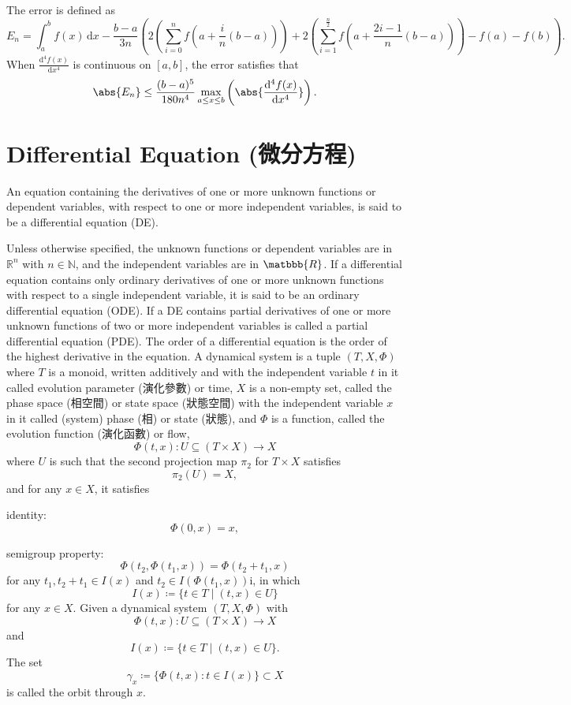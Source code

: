 \documentclass[a4paper,12pt]{report}
\begin{document}
{{{{{{{{{{{{{{{{{The error is defined as
\[E_n=\int_a^bf(x)\,\mathrm{d}x-\frac{b-a}{3n}\left(2\left(\sum_{i=0}^nf(a+\frac{i}{n}(b-a))\right)+2\left(\sum_{i=1}^{\frac{n}{2}}f(a+\frac{2i-1}{n}(b-a))\right)-f(a)-f(b)\right).\]
When $\frac{\mathrm{d}^4f(x)}{\mathrm{d}x^4}$ is continuous on $[a,b]$, the error satisfies that
\[\abs{E_n}\leq\frac{(b-a)^5}{180n^4}\max_{a\leq x\leq b}\left(\abs{\frac{\mathrm{d}^4f(x)}{\mathrm{d}x^4}}\right).\]



\section{Differential Equation (微分方程)}
An equation containing the derivatives of one or more unknown functions or dependent variables, with respect to one or more independent variables, is said to be a differential equation (DE).

Unless otherwise specified, the unknown functions or dependent variables are in $\mathbb{R}^n$ with $n\in\mathbb{N}$, and the independent variables are in $\matbbb{R}$.
If a differential equation contains only ordinary derivatives of one or more unknown functions with respect to a single independent variable, it is said to be an ordinary differential equation (ODE).
If a DE contains partial derivatives of one or more unknown functions of two or more independent variables is called a partial differential equation (PDE).
The order of a differential equation is the order of the highest derivative in the equation.
A dynamical system is a tuple $(T, X, \Phi)$ where $T$ is a monoid, written additively and with the independent variable $t$ in it called evolution parameter (演化參數) or time, $X$ is a non-empty set, called the phase space (相空間) or state space (狀態空間) with the independent variable $x$ in it called (system) phase (相) or state (狀態), and $\Phi$ is a function, called the evolution function (演化函數) or flow,
\[\Phi(t,x)\colon U\subseteq(T\times X)\to X\]
where $U$ is such that the second projection map $\pi_2$ for $T\times X$ satisfies
\[\pi_2(U)=X,\]
and for any $x \in X$, it satisfies
\bit
\item identity:
\[\Phi (0,x)=x,\]
\item semigroup property:
\[\Phi (t_{2},\Phi (t_{1},x))=\Phi (t_{2}+t_{1},x)\]
for any $t_{1},t_{2}+t_{1}\in I(x)$ and $t_{2}\in I(\Phi (t_{1},x))$i, in which
\[I(x)\coloneq\{t\in T\mid(t,x)\in U\}\]
for any $x\in X$.
\eit
{}
Given a dynamical system $(T, X, \Phi)$ with
\[\Phi(t,x)\colon U\subseteq(T\times X)\to X\]
and
\[I(x)\coloneq\{t\in T\mid(t,x)\in U\}.\]
The set
\[\gamma _{x}\coloneq\{\Phi (t,x)\colon t\in I(x)\}\subset X\]
is called the orbit through $x$.

}}}}}}}}}}}}}}}}}
\end{document}
